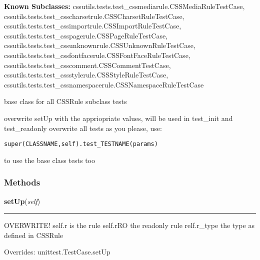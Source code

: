 \textbf{Known Subclasses:}
cssutils.tests.test\_cssmediarule.CSSMediaRuleTestCase,
    cssutils.tests.test\_csscharsetrule.CSSCharsetRuleTestCase,
    cssutils.tests.test\_cssimportrule.CSSImportRuleTestCase,
    cssutils.tests.test\_csspagerule.CSSPageRuleTestCase,
    cssutils.tests.test\_cssunknownrule.CSSUnknownRuleTestCase,
    cssutils.tests.test\_cssfontfacerule.CSSFontFaceRuleTestCase,
    cssutils.tests.test\_csscomment.CSSCommentTestCase,
    cssutils.tests.test\_cssstylerule.CSSStyleRuleTestCase,
    cssutils.tests.test\_cssnamespacerule.CSSNamespaceRuleTestCase

base class for all CSSRule subclass tests

overwrite setUp with the appriopriate values, will be used in test\_init 
and test\_readonly overwrite all tests as you please, use:

\begin{alltt}
   super(CLASSNAME, self).test\_TESTNAME(params)\end{alltt}

to use the base class tests too



  \subsubsection{Methods}

    \vspace{0.5ex}

\hspace{.8\funcindent}\begin{boxedminipage}{\funcwidth}

    \raggedright \textbf{setUp}(\textit{self})

    \vspace{-1.5ex}

    \rule{\textwidth}{0.5\fboxrule}
\setlength{\parskip}{2ex}
    OVERWRITE! self.r is the rule self.rRO the readonly rule relf.r\_type 
    the type as defined in CSSRule

\setlength{\parskip}{1ex}
      Overrides: unittest.TestCase.setUp

    \end{boxedminipage}

    \label{cssutils:tests:test_cssrule:CSSRuleTestCase:test_init}

